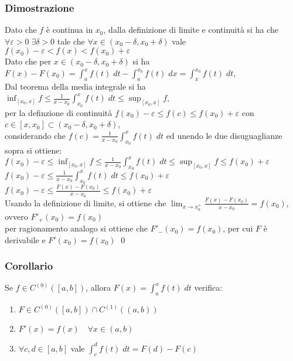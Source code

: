 \documentclass[a4paper]{article}
\newcommand\cont[2]{C^{(#1)} \left({#2}\right)}
\begin{document}
\subsubsection*{Dimostrazione}
Dato che \(f\) è continua in \(x_0\), dalla definizione di limite e continuità si ha che \(\forall \varepsilon > 0 \; \exists \delta > 0\)
tale che \(\forall x \in \left(x_0 - \delta, x_0 + \delta\right)\) vale \(f(x_0) - \varepsilon < f(x) < f(x_0) + \varepsilon\) \\
Dato che per \(x \in \left(x_0 - \delta, x_0 + \delta\right)\) si ha \(\displaystyle F(x) - F(x_0) = \int_{a}^{x} f(t)\; dt - \int_{a}^{x_0} f(t) \; dx = \int_{x}^{x_0} f(t)\; dt\), \\
Dal teorema della media integrale si ha \(\displaystyle \inf_{\left[x_0, x\right]} f \leq \frac{1}{x-x_0} \int_{x_0}^{x} f(t)\; dt \leq \sup_{\left[x_0, x\right]} f\), \\
per la definzione di continuità \(\displaystyle f(x_0) - \varepsilon \leq f(c) \leq f(x_0) + \varepsilon\) con \(c \in \left[x, x_0\right] \subset \left(x_0 - \delta, x_0 + \delta\right)\), \\
considerando che \(\displaystyle f(c) = \frac{1}{x-x_0} \int_{x_0}^{x} f(t)\; dt\) ed unendo le due disuguaglianze sopra si ottiene: \\
\(\displaystyle f(x_0) - \varepsilon \leq \inf_{\left[x_0, x\right]} f \leq \frac{1}{x-x_0} \int_{x_0}^{x} f(t)\; dt \leq \sup_{\left[x_0, x\right]} f \leq f(x_0) + \varepsilon\) \\
\(\displaystyle f(x_0) - \varepsilon \leq \frac{1}{x-x_0} \int_{x_0}^{x} f(t)\; dt \leq f(x_0) + \varepsilon\) \\
\(\displaystyle f(x_0) - \varepsilon \leq \frac{F(x) - F(x_0)}{x-x_0} \leq f(x_0) + \varepsilon\) \\
Usando la definizione di limite, si ottiene che \(\displaystyle \lim_{x \to x_0^+} \frac{F(x) - F(x_0)}{x - x_0} = f(x_0)\), ovvero \(F'_+(x_0) = f(x_0)\) \\
per ragionamento analogo si ottiene che \(F'_-(x_0) = f(x_0)\), per cui \(F\) è derivabile e \(F'(x_0) = f(x_0)\) \qed

\subsubsection*{Corollario}
Se \(f \in \cont{0}{\left[a, b\right]}\), allora \(\displaystyle F(x) = \int_{a}^{x} f(t)\; dt\) verifica:
\begin{enumerate}
	\item \(F \in \cont{0}{\left[a, b\right]} \cap \cont{1}{\left(a, b\right)}\)
	\item \(F'(x) = f(x) \quad \forall x \in \left(a, b\right)\)
	\item \(\forall c, d \in \left[a, b\right]\) vale \(\displaystyle \int_{c}^{d} f(t)\; dt = F(d) - F(c)\)
\end{enumerate}
\end{document}
